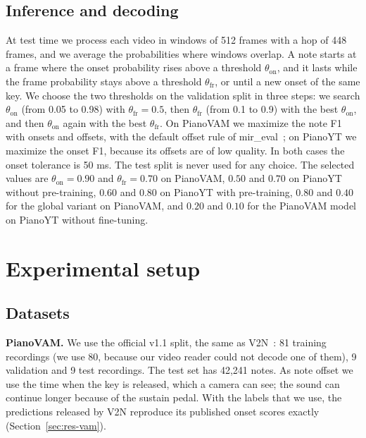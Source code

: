 \documentclass[pdflatex,sn-mathphys-num]{sn-jnl}
\begin{document}
\subsection{Inference and decoding}

At test time we process each video in windows of 512 frames with a hop of 448 frames, and we average the probabilities where windows overlap. A note starts at a frame where the onset probability rises above a threshold $\theta_{\mathrm{on}}$, and it lasts while the frame probability stays above a threshold $\theta_{\mathrm{fr}}$, or until a new onset of the same key. We choose the two thresholds on the validation split in three steps: we search $\theta_{\mathrm{on}}$ (from 0.05 to 0.98) with $\theta_{\mathrm{fr}}=0.5$, then $\theta_{\mathrm{fr}}$ (from 0.1 to 0.9) with the best $\theta_{\mathrm{on}}$, and then $\theta_{\mathrm{on}}$ again with the best $\theta_{\mathrm{fr}}$. On PianoVAM we maximize the note F1 with onsets and offsets, with the default offset rule of mir\_eval~\cite{raffel2014}; on PianoYT we maximize the onset F1, because its offsets are of low quality. In both cases the onset tolerance is 50 ms. The test split is never used for any choice. The selected values are $\theta_{\mathrm{on}}=0.90$ and $\theta_{\mathrm{fr}}=0.70$ on PianoVAM, $0.50$ and $0.70$ on PianoYT without pre-training, $0.60$ and $0.80$ on PianoYT with pre-training, $0.80$ and $0.40$ for the global variant on PianoVAM, and $0.20$ and $0.10$ for the PianoVAM model on PianoYT without fine-tuning.

\section{Experimental setup}\label{sec:setup}

\subsection{Datasets}

\textbf{PianoVAM.} We use the official v1.1 split, the same as V2N~\cite{kim2026v2n}: 81 training recordings (we use 80, because our video reader could not decode one of them), 9 validation and 9 test recordings. The test set has 42,241 notes. As note offset we use the time when the key is released, which a camera can see; the sound can continue longer because of the sustain pedal. With the labels that we use, the predictions released by V2N reproduce its published onset scores exactly (Section~\ref{sec:res-vam}).
\end{document}
